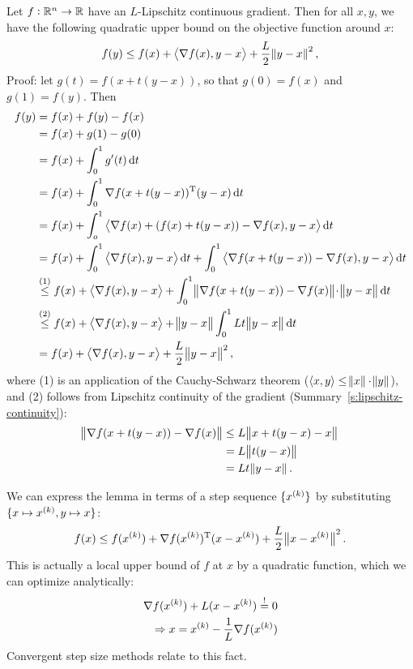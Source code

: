\documentclass{article}
\begin{document}
\label{s:descent-lemma}

Let \(f: \mathbb{R}^n \to \mathbb{R}\) have an \(L\)-Lipschitz continuous gradient.  Then for all \(x, y\), we
have the following quadratic upper bound on the objective function around \(x\):
\begin{equation*}
  f(y) \leq f(x) + \iprod{\nabla f(x)}{y - x} + \frac{L}{2}\enVert{y - x}^2,
\end{equation*}
Proof: let \(g(t) = f(x + t(y - x))\), so that \(g(0) = f(x)\) and \(g(1) = f(y)\). Then
\begin{align*}
  f(y) &= f(x) + f(y) - f(x) \\
       &= f(x) + g(1) - g(0) \\
       &= f(x) + \int_0^1 g'(t) \dif t \\
       &= f(x) + \int_0^1 \T{\nabla f(x + t(y - x))} (y - x) \dif t \\
       &= f(x) + \int_o^1 \iprod{\nabla f(x) + (f(x) + t(y - x)) - \nabla f(x)}{y - x} \dif t \\
       &= f(x) + \int_0^1 \iprod{\nabla f(x)}{y - x} \dif t
         + \int_0^1 \iprod{\nabla f(x + t(y - x)) - \nabla f(x)}{y - x} \dif t \\
       &\overset{(1)}{\leq} f(x) + \iprod{\nabla f(x)}{y - x}
         + \int_0^1 \enVert[1]{\nabla f(x + t(y - x)) - \nabla f(x)}\! \cdot \enVert[1]{y - x} \dif t \\
       &\overset{(2)}{\leq} f(x) + \iprod{\nabla f(x)}{y - x} + \enVert[1]{y - x} \int_0^1 Lt\enVert[1]{y - x} \dif t \\
       &= f(x) + \iprod{\nabla f(x)}{y - x} + \frac{L}{2}\enVert[1]{y - x}^2,
\end{align*}
where (1) is an application of the Cauchy-Schwarz theorem
(\(\langle x, y \rangle \leq \enVert{x} \cdot \enVert{y}\)), and (2) follows from Lipschitz
continuity of the gradient (Summary~\ref{s:lipschitz-continuity}):
\begin{align*}
  \enVert{\nabla f(x + t(y - x)) - \nabla f(x)} &\leq L \enVert{x + t(y - x) - x} \\
                                                &= L \enVert{t(y - x)} \\
                                                &= Lt \enVert{y - x}.
\end{align*}

\label{s:descent-lemma-interpretation}

We can express the lemma in terms of a step sequence \(\{x^{(k)}\}\) by substituting
\(\{x \mapsto x^{(k)}, y \mapsto x\}\):
\begin{equation*}
  f(x) \leq f(\kth{x}) + \T{\nabla f(\kth{x})}(x - \kth{x}) + \frac{L}{2}\enVert[1]{x - \kth{x}}^2.
\end{equation*}
This is actually a local upper bound of \(f\) at \(x\) by a quadratic function, which we can
optimize analytically:
\begin{gather*}
  \nabla f(x^{(k)}) + L (x - x^{(k)}) \overset{!}{=} 0 \\
  \quad \Rightarrow x = x^{(k)} - \frac{1}{L} \nabla f(x^{(k)})
\end{gather*}
Convergent step size methods relate to this fact.
\end{document}
